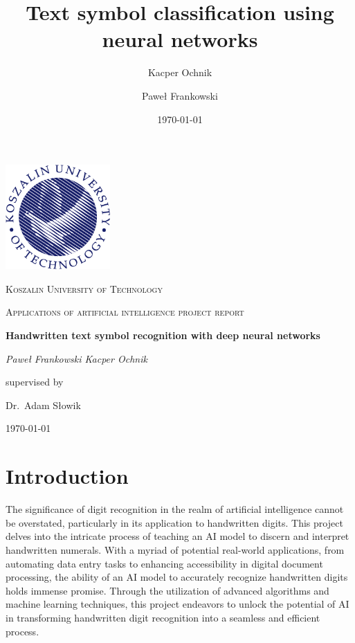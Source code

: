 \documentclass{article}
\begin{document}
\title{Text symbol classification using neural networks}
\author{Kacper Ochnik \and Paweł Frankowski}
\date{\today}

\begin{titlepage}
	\centering
	\includegraphics[width=0.3\textwidth]{Logo_PK_kolor_EN_PNG.png}\par\vspace{1cm}
	{\textsc{Koszalin University of Technology} \par}
	\vspace{1cm}
	{\Large \textsc{Applications of artificial intelligence project report}\par}
	\vspace{1.5cm}
	{\huge\bfseries Handwritten text symbol recognition with deep neural networks
	\par}
	\vspace{2cm}
	{\Large\itshape {Paweł Frankowski \space Kacper Ochnik}\par}
	\vfill
	supervised by\par
	Dr.~Adam Słowik

	\vfill

	{\large \today\par}
\end{titlepage}

\tableofcontents
\newpage

\section{Introduction}
The significance of digit recognition in the realm of artificial intelligence cannot be overstated, particularly in its application to handwritten digits. This project delves into the intricate process of teaching an AI model to discern and interpret handwritten numerals. With a myriad of potential real-world applications, from automating data entry tasks to enhancing accessibility in digital document processing, the ability of an AI model to accurately recognize handwritten digits holds immense promise. Through the utilization of advanced algorithms and machine learning techniques, this project endeavors to unlock the potential of AI in transforming handwritten digit recognition into a seamless and efficient process.
\end{document}

